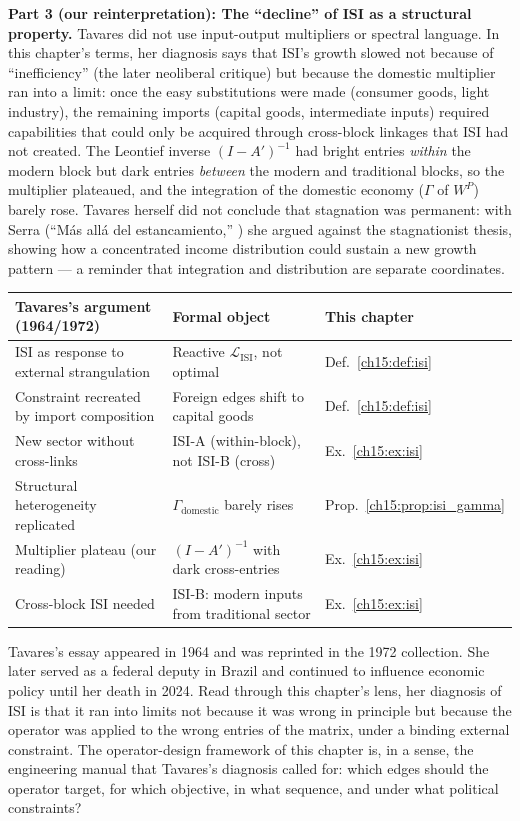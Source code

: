 \documentclass[../structural_economics_book.tex]{subfiles}
\begin{document}
\textbf{Part 3 (our reinterpretation): The ``decline'' of ISI as a structural property.} Tavares did not use input-output multipliers or spectral language. In this chapter's terms, her diagnosis says that ISI's growth slowed not because of ``inefficiency'' (the later neoliberal critique) but because the domestic multiplier ran into a limit: once the easy substitutions were made (consumer goods, light industry), the remaining imports (capital goods, intermediate inputs) required capabilities that could only be acquired through cross-block linkages that ISI had not created. The Leontief inverse $(I - A')^{-1}$ had bright entries \textit{within} the modern block but dark entries \textit{between} the modern and traditional blocks, so the multiplier plateaued, and the integration of the domestic economy ($\Gamma$ of $W^P$) barely rose. Tavares herself did not conclude that stagnation was permanent: with Serra (``M\'{a}s all\'{a} del estancamiento,'' \citeyear{tavares1971mas}) she argued against the stagnationist thesis, showing how a concentrated income distribution could sustain a new growth pattern --- a reminder that integration and distribution are separate coordinates.

\begin{center}
\begin{tabularx}{\textwidth}{LLL}
\toprule
\textbf{Tavares's argument (1964/1972)} & \textbf{Formal object} & \textbf{This chapter} \\
\midrule
ISI as response to external strangulation & Reactive $\mathcal{L}_{\text{ISI}}$, not optimal & Def.~\ref{ch15:def:isi} \\
Constraint recreated by import composition & Foreign edges shift to capital goods & Def.~\ref{ch15:def:isi} \\
New sector without cross-links & ISI-A (within-block), not ISI-B (cross) & Ex.~\ref{ch15:ex:isi} \\
Structural heterogeneity replicated & $\Gamma_{\text{domestic}}$ barely rises & Prop.~\ref{ch15:prop:isi_gamma} \\
Multiplier plateau (our reading) & $(I - A')^{-1}$ with dark cross-entries & Ex.~\ref{ch15:ex:isi} \\
Cross-block ISI needed & ISI-B: modern inputs from traditional sector & Ex.~\ref{ch15:ex:isi} \\
\bottomrule
\end{tabularx}
\end{center}

Tavares's essay appeared in 1964 and was reprinted in the 1972 collection. She later served as a federal deputy in Brazil and continued to influence economic policy until her death in 2024. Read through this chapter's lens, her diagnosis of ISI is that it ran into limits not because it was wrong in principle but because the operator was applied to the wrong entries of the matrix, under a binding external constraint. The operator-design framework of this chapter is, in a sense, the engineering manual that Tavares's diagnosis called for: which edges should the operator target, for which objective, in what sequence, and under what political constraints?
\end{document}
